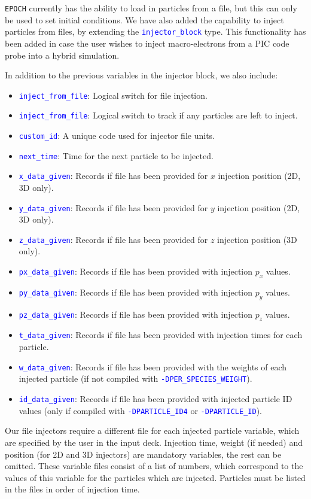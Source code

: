 \documentclass[12pt]{article}
\numberwithin{equation}{section}
\begin{document}
\texttt{EPOCH} currently has the ability to load in particles from a file, but this can only be used to set initial conditions. We have also added the capability to inject particles from files, by extending the \textcolor{blue}{\texttt{injector\_block}} type. This functionality has been added in case the user wishes to inject macro-electrons from a PIC code probe into a hybrid simulation.

In addition to the previous variables in the injector block, we also include:
%
\begin{itemize}
  \item \textcolor{blue}{\texttt{inject\_from\_file}}: Logical switch for file injection.
%
  \item \textcolor{blue}{\texttt{inject\_from\_file}}: Logical switch to track if any particles are left to inject.
%
  \item \textcolor{blue}{\texttt{custom\_id}}: A unique code used for injector file units.
%
  \item \textcolor{blue}{\texttt{next\_time}}: Time for the next particle to be injected.
% 
  \item \textcolor{blue}{\texttt{x\_data\_given}}: Records if file has been provided for $x$ injection position (2D, 3D only).
%
  \item \textcolor{blue}{\texttt{y\_data\_given}}: Records if file has been provided for $y$ injection position (2D, 3D only).
%
  \item \textcolor{blue}{\texttt{z\_data\_given}}: Records if file has been provided for $z$ injection position (3D only).
%
  \item \textcolor{blue}{\texttt{px\_data\_given}}: Records if file has been provided with injection $p_x$ values.
%
  \item \textcolor{blue}{\texttt{py\_data\_given}}: Records if file has been provided with injection $p_y$ values.
%
  \item \textcolor{blue}{\texttt{pz\_data\_given}}: Records if file has been provided with injection $p_z$ values.
%
  \item \textcolor{blue}{\texttt{t\_data\_given}}: Records if file has been provided with injection times for each particle.
%
  \item \textcolor{blue}{\texttt{w\_data\_given}}: Records if file has been provided with  the weights of each injected particle (if not compiled with \textcolor{blue}{\texttt{-DPER\_SPECIES\_WEIGHT}}).
%
  \item \textcolor{blue}{\texttt{id\_data\_given}}: Records if file has been provided with injected particle ID values (only if compiled with \textcolor{blue}{\texttt{-DPARTICLE\_ID4}} or \textcolor{blue}{\texttt{-DPARTICLE\_ID}}).
%
\end{itemize}
%
Our file injectors require a different file for each injected particle variable, which are specified by the user in the input deck. Injection time, weight (if needed) and position (for 2D and 3D injectors) are mandatory variables, the rest can be omitted. These variable files consist of a list of numbers, which correspond to the values of this variable for the particles which are injected. Particles must be listed in the files in order of injection time.
\end{document}
